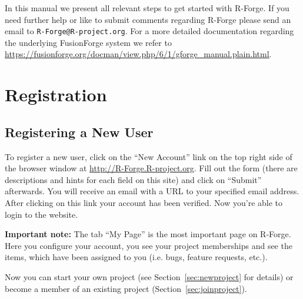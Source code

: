 \documentclass[a4paper]{article}
\let\email=\texttt
\newcommand{\proglang}[1]{\textsf{#1}}
\begin{document}

In this manual we present all relevant steps to get started with
\proglang{R}-Forge. If you need further help or like to submit
comments regarding \proglang{R}-Forge please send an email to
\email{R-Forge@R-project.org}. For a more detailed documentation
regarding the underlying FusionForge system we refer to
\url{https://fusionforge.org/docman/view.php/6/1/gforge_manual.plain.html}.

\section{Registration}
\label{sec:registration}

\subsection{Registering a  New User}

To register a new user, click on the ``New Account'' link on the top
right side of the browser window at \url{http://R-Forge.R-project.org}.
Fill out the form (there are descriptions and hints for each field on
this site) and click on ``Submit'' afterwards. You will receive an
email with
a URL to your specified email address. After clicking on this link
your account has been verified. Now you're able to login to the
website.
\newline

\textbf{Important note:} The tab ``My Page'' is the most important
page on \proglang{R}-Forge. Here you configure your account, you see your
project memberships and see the items, which have been assigned to you
(i.e. bugs, feature requests, etc.).
\newline

Now you can start your own project (see Section~\ref{sec:newproject}
for details) or become a member of an existing project
(Section~\ref{sec:joinproject}). 
\end{document}
